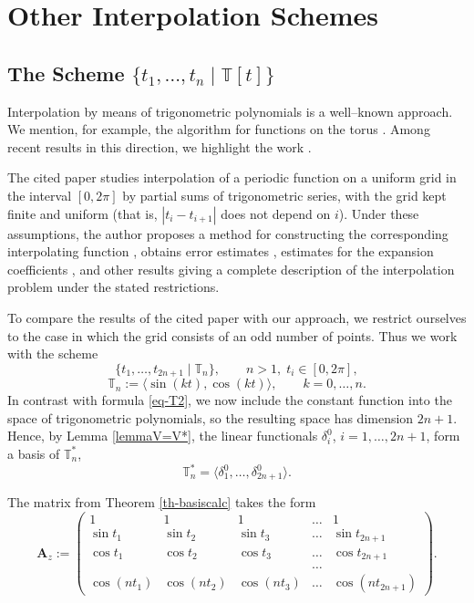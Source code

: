 \documentclass{article}
\theoremstyle{definition}
\theoremstyle{definition}
\numberwithin{figure}{section}
\newcommand{\1}{\mathbf{1}}
\begin{document}
\section{Other Interpolation Schemes}

\subsection{The Scheme \texorpdfstring{$\{t_1,\ldots, t_n \mid \mathbb{T}[t]\}$}{t1,...,tn | T[t]}}\label{sec-zou25}

Interpolation by means of trigonometric polynomials is a well–known approach. We mention, for example, the algorithm for functions on the torus \cite{KunPot07}. Among recent results in this direction, we highlight the work \cite{zou25triginterpol}.

The cited paper studies interpolation of a periodic function on a uniform grid in the interval \([0,2\pi]\) by partial sums of trigonometric series, with the grid kept finite and uniform (that is, \(|t_i - t_{i+1}|\) does not depend on \(i\)). Under these assumptions, the author proposes a method for constructing the corresponding interpolating function \cite[Algorithm 4.1]{zou25triginterpol}, obtains error estimates \cite[Section 5.3]{zou25triginterpol}, estimates for the expansion coefficients \cite[Theorem 2.2]{zou25triginterpol}, and other results giving a complete description of the interpolation problem under the stated restrictions.

To compare the results of the cited paper with our approach, we restrict ourselves to the case in which the grid consists of an odd number of points. Thus we work with the scheme
\begin{equation}\label{eq-schemezou=odd}
    \{t_1,\ldots, t_{2n+1} \mid \mathbb{T}_n\}, \qquad n>1,\; t_i\in[0,2\pi],
\end{equation}
\[
    \mathbb{T}_n := \langle \sin(kt), \cos(kt) \rangle,\qquad k = 0,\ldots, n.
\]
In contrast with formula \eqref{eq-T2}, we now include the constant function into the space of trigonometric polynomials, so the resulting space has dimension \(2n+1\). Hence, by Lemma \ref{lemmaV=V*}, the linear functionals \(\delta^0_i\), \(i=1,\ldots,2n+1\), form a basis of \(\mathbb{T}_n^*\),
\[
    \mathbb{T}_n^* = \langle \delta^0_1,\ldots,\delta^0_{2n+1} \rangle.
\]

The matrix from Theorem \ref{th-basiscalc} takes the form
\[
\mathbf{A}_z :=
    \begin{pmatrix}
        1 & 1 & 1 & \dots & 1\\
        \sin t_1 & \sin t_2 & \sin t_3 & \ldots & \sin t_{2n+1}\\
        \cos t_1 & \cos t_2 & \cos t_3 & \ldots & \cos t_{2n+1}\\
        & & & \ldots & \\
        \cos(nt_1) & \cos(nt_2) & \cos(nt_3) & \ldots & \cos(nt_{2n+1})
    \end{pmatrix}.
\]
\end{document}
